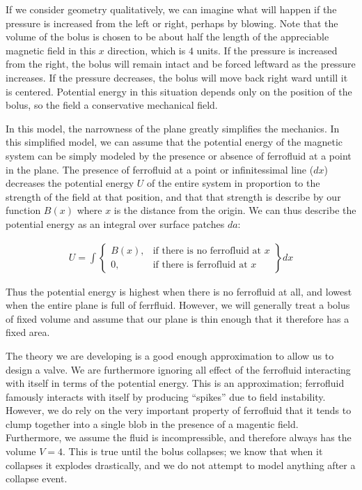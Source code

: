 \documentclass{asme2ej}
\begin{document}
If we consider geometry qualitatively, we can imagine what will happen
if the pressure is increased from the left or right, perhaps by blowing.
Note that the volume of the bolus is chosen to be about
half the length
of the appreciable magnetic field in this $x$ direction, which is $4$ units.
If the pressure is increased from the right, the bolus will remain intact
and be forced leftward as the pressure increases. If the pressure decreases,
the bolus will move back right ward untill it is centered.
Potential energy in this situation depends only on the position of the bolus,
so the field a conservative mechanical field.


In this model, the narrowness of the plane greatly simplifies the mechanics.
In this simplified model, we can assume
that the potential energy of the magnetic system can be simply
modeled by the presence or absence of ferrofluid at a point in the plane.
The presence of ferrofluid at a point or infinitessimal line ($dx$) decreases the potential energy $U$
of the entire system in proportion to the strength of the field at that position,
and that that strength is describe by our function $B(x)$ where $x$ is the
distance from the origin.
We can thus describe the potential energy as an integral over surface patches $da$:

\begin{align}
  U = \int
\left\{
    \begin{array}{lr}
      B(x)  , & \text{if there is no ferrofluid at } x \\
      0 , & \text{if there is ferrofluid at } x
    \end{array}
\right\} dx
\end{align}

Thus the potential energy is highest when there is no ferrofluid at all,
and lowest when the entire plane is full of ferrfluid.
However, we will generally treat a bolus of fixed volume and assume
that our plane is thin enough that it therefore has a fixed area.


The theory we are developing is a good enough approximation
to allow us to design a valve.
We are furthermore ignoring all effect of the ferrofluid
interacting with itself in terms
of the potential energy.
This is an approximation; ferrofluid famously interacts with itself
by producing ``spikes'' due to field instability.
However, we do rely on the very important property of ferrofluid that
it tends to clump together into a single blob in the presence
of a magentic field.
Furthermore,
we assume the fluid is incompressible,
and therefore always has the volume $V = 4$.
This is true until the bolus collapses; we know that
when it collapses it explodes drastically,
and we do not attempt to model anything after
a collapse event.
\end{document}
